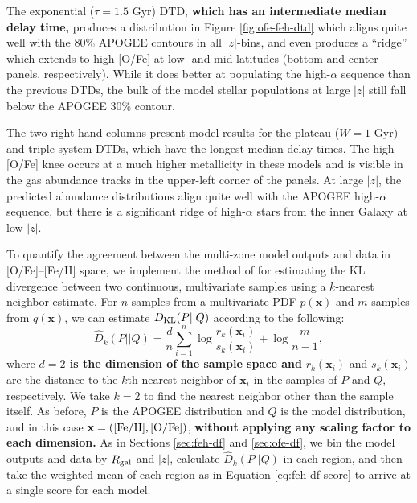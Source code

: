 \documentclass[twocolumn,twocolappendix,linenumbers]{aastex631}
\begin{document}
The exponential ($\tau=1.5$ Gyr) DTD, {\bf which has an intermediate median delay time,} produces a distribution in Figure \ref{fig:ofe-feh-dtd} which aligns quite well with the 80\% APOGEE contours in all $|z|$-bins, and even produces a ``ridge'' which extends to high [O/Fe] at low- and mid-latitudes (bottom and center panels, respectively). While it does better at populating the high-$\alpha$ sequence than the previous DTDs, the bulk of the model stellar populations at large $|z|$ still fall below the APOGEE 30\% contour. 

The two right-hand columns present model results for the plateau ($W=1$ Gyr) and triple-system DTDs, which have the longest median delay times. The high-[O/Fe] knee occurs at a much higher metallicity in these models and is visible in the gas abundance tracks in the upper-left corner of the panels. At large $|z|$, the predicted abundance distributions align quite well with the APOGEE high-$\alpha$ sequence, but there is a significant ridge of high-$\alpha$ stars from the inner Galaxy at low $|z|$.

To quantify the agreement between the multi-zone model outputs and data in [O/Fe]--[Fe/H] space, we implement the method of \citet{PerezCruz2008-KLTest2D} for estimating the KL divergence between two continuous, multivariate samples using a $k$-nearest neighbor estimate. For $n$ samples from a multivariate PDF $p(\mathbf{x})$ and $m$ samples from $q(\mathbf{x})$, we can estimate $D_{\rm KL}(P||Q)$ according to the following:
\begin{equation}
    \label{eq:2d-kl-divergence}
    \hat D_k(P||Q) = \frac dn \sum_{i=1}^n\log\frac{r_k(\mathbf{x}_i)}{s_k(\mathbf{x}_i)} + \log\frac{m}{n-1},
\end{equation}
where {\bf $d=2$ is the dimension of the sample space and} $r_k(\mathbf{x}_i)$ and $s_k(\mathbf{x}_i)$ are the distance to the $k$th nearest neighbor of $\mathbf{x}_i$ in the samples of $P$ and $Q$, respectively. We take $k=2$ to find the nearest neighbor other than the sample itself. As before, $P$ is the APOGEE distribution and $Q$ is the model distribution, and in this case $\mathbf{x}=({\rm [Fe/H]}, {\rm [O/Fe]})$, {\bf without applying any scaling factor to each dimension.}
As in Sections \ref{sec:feh-df} and \ref{sec:ofe-df}, we bin the model outputs and data by $R_{\rm gal}$ and $|z|$, calculate $\hat D_k(P||Q)$ in each region, and then take the weighted mean of each region as in Equation \ref{eq:feh-df-score} to arrive at a single score for each model.
\end{document}
